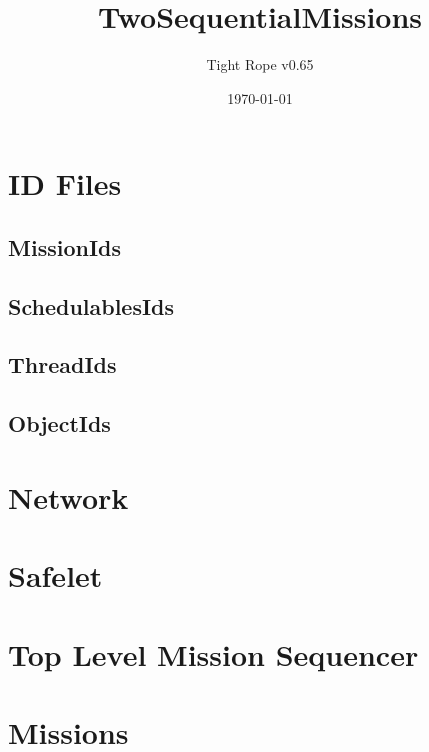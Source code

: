 \documentclass[10pt,a4paper]{article}
\title{TwoSequentialMissions}
\author{Tight Rope v0.65}
\date{\today}
\begin{document}
\maketitle

\section{ID Files}
\subsection{MissionIds}

\newpage

\subsection{SchedulablesIds}

\newpage

\subsection{ThreadIds}

\newpage

\subsection{ObjectIds}

\newpage

\section{Network}

\newpage


\section{Safelet}

\newpage
{}
\newpage

\section{Top Level Mission Sequencer}

\newpage
{}
\newpage

\section{Missions}
\end{document}
